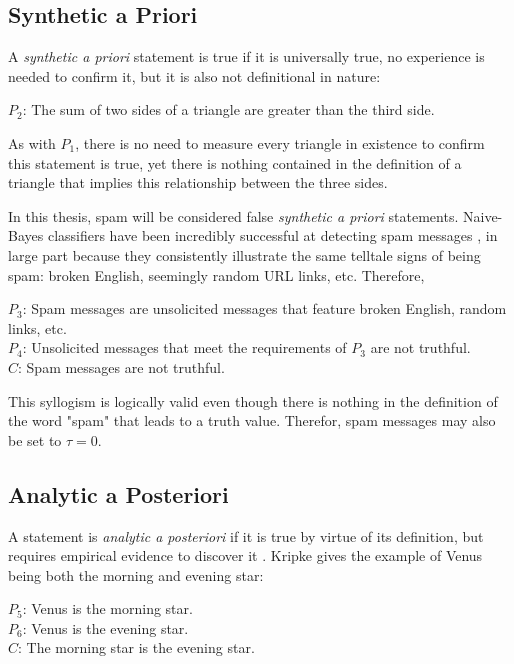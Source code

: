 \documentclass[preprint,review,12pt]{elsarticle}
\begin{document}
\subsection{Synthetic a Priori}
A \textit{synthetic a priori} statement is true if it is universally true, no experience is needed to confirm it, but it is also not definitional in nature:
\begin{center}
    $P_2$: The sum of two sides of a triangle are greater than the third side.
\end{center}
 
As with $P_1$, there is no need to measure every triangle in existence to confirm this statement is true, yet there is nothing contained in the definition of a triangle that implies this relationship between the three sides.

In this thesis, spam will be considered false \textit{synthetic a priori} statements. Naive-Bayes classifiers have been incredibly successful at detecting spam messages \cite{wang2010detecting,xu2019exploiting,ahmed2018detecting}, in large part because they consistently illustrate the same telltale signs of being spam: broken English, seemingly random URL links, etc. Therefore, \begin{center}
    $P_3$: Spam messages are unsolicited messages that feature broken English, random links, etc. \\
$P_4$: Unsolicited messages that meet the requirements of $P_3$ are not truthful.\\
$C$: Spam messages are not truthful.
\end{center}
 
This syllogism is logically valid even though there is nothing in the definition of the word "spam" that leads to a truth value. Therefor, spam messages may also be set to $\tau = 0$.


\subsection{Analytic a Posteriori}
A statement is \textit{analytic a posteriori} if it is true by virtue of its definition, but requires empirical evidence to discover it \cite{kripke1972naming}. Kripke gives the example of Venus being both the morning and evening star: \begin{center}
   $P_5$: Venus is the morning star.\\
$P_6$: Venus is the evening star.\\
$C$: The morning star is the evening star. 
\end{center}
\end{document}
